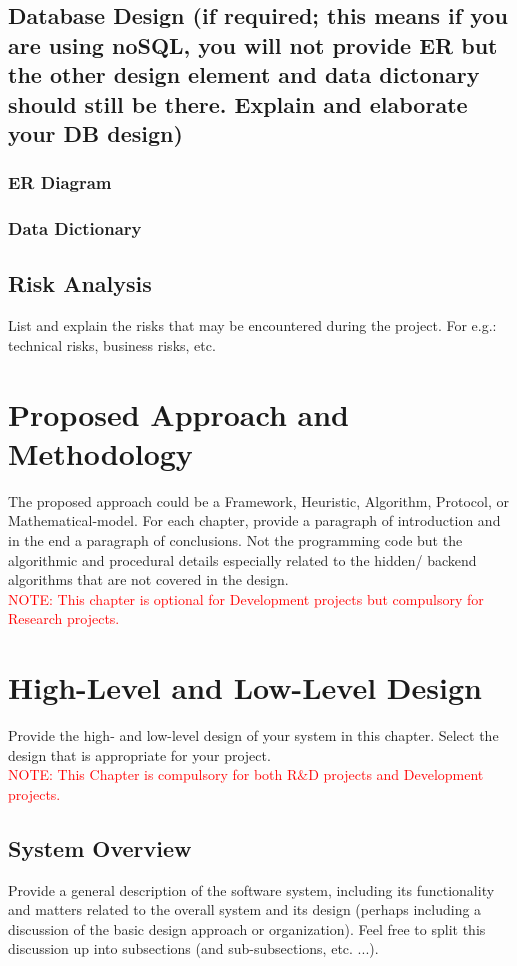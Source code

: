 \documentclass{FastFyp}
\begin{document}
\section{Database Design (if required; this means if you are using noSQL, you will not provide ER but the other design element and data dictonary should still be there. Explain and elaborate your DB design)}
\subsection{ER Diagram}
\subsection{Data Dictionary}
\section{ Risk Analysis}
List and explain the risks that may be encountered during the project. For e.g.: technical risks, business risks, etc.
\chapter{Proposed Approach and Methodology}
The proposed approach could be a Framework, Heuristic, Algorithm, Protocol, or Mathematical-model.
For each chapter, provide a paragraph of introduction and in the end a paragraph of conclusions. Not the programming code but the algorithmic and procedural details especially related to the hidden/ backend algorithms that are not covered in the design.\\
\textcolor{red}{NOTE: This chapter is optional for Development projects but compulsory for Research projects.} 
\chapter{High-Level and Low-Level Design}
Provide the high- and low-level design of your system in this chapter. Select the design that is appropriate for your project.\\
\textcolor{red}{NOTE: This Chapter is compulsory for both R\&D projects and Development projects.}
\section{System Overview}
Provide a general description of the software system, including its functionality and matters related to the overall system and its design (perhaps including a discussion of the basic design approach or organization). Feel free to split this discussion up into subsections (and sub-subsections, etc. ...).
\end{document}
